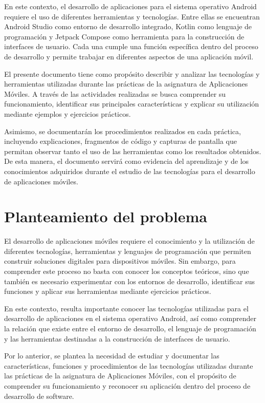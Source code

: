 \documentclass[12pt,a4paper]{article}
\begin{document}
En este contexto, el desarrollo de aplicaciones para el sistema
operativo Android requiere el uso de diferentes herramientas y
tecnologías. Entre ellas se encuentran Android Studio como entorno
de desarrollo integrado, Kotlin como lenguaje de programación y
Jetpack Compose como herramienta para la construcción de
interfaces de usuario. Cada una cumple una función específica
dentro del proceso de desarrollo y permite trabajar en diferentes
aspectos de una aplicación móvil.

El presente documento tiene como propósito describir y analizar
las tecnologías y herramientas utilizadas durante las prácticas
de la asignatura de Aplicaciones Móviles. A través de las
actividades realizadas se busca comprender su funcionamiento,
identificar sus principales características y explicar su
utilización mediante ejemplos y ejercicios prácticos.

Asimismo, se documentarán los procedimientos realizados en cada
práctica, incluyendo explicaciones, fragmentos de código y
capturas de pantalla que permitan observar tanto el uso de las
herramientas como los resultados obtenidos. De esta manera, el
documento servirá como evidencia del aprendizaje y de los
conocimientos adquiridos durante el estudio de las tecnologías
para el desarrollo de aplicaciones móviles.

\section{Planteamiento del problema}

El desarrollo de aplicaciones móviles requiere el conocimiento y
la utilización de diferentes tecnologías, herramientas y
lenguajes de programación que permiten construir soluciones
digitales para dispositivos móviles. Sin embargo, para comprender
este proceso no basta con conocer los conceptos teóricos, sino
que también es necesario experimentar con los entornos de
desarrollo, identificar sus funciones y aplicar sus herramientas
mediante ejercicios prácticos.

En este contexto, resulta importante conocer las tecnologías
utilizadas para el desarrollo de aplicaciones en el sistema
operativo Android, así como comprender la relación que existe
entre el entorno de desarrollo, el lenguaje de programación y
las herramientas destinadas a la construcción de interfaces
de usuario.

Por lo anterior, se plantea la necesidad de estudiar y
documentar las características, funciones y procedimientos de
las tecnologías utilizadas durante las prácticas de la
asignatura de Aplicaciones Móviles, con el propósito de
comprender su funcionamiento y reconocer su aplicación dentro
del proceso de desarrollo de software.
\end{document}

